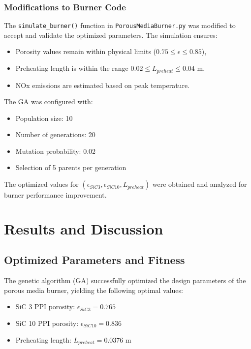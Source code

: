 \documentclass[12pt]{report}
\begin{document}
\subsection{Modifications to Burner Code}
The \texttt{simulate\_burner()} function in \texttt{PorousMediaBurner.py} was modified to accept and validate the optimized parameters. The simulation ensures:
\begin{itemize}
    \item Porosity values remain within physical limits ($0.75 \leq \epsilon \leq 0.85$),
    \item Preheating length is within the range $0.02 \leq L_{preheat} \leq 0.04$ m,
    \item NOx emissions are estimated based on peak temperature.
\end{itemize}

The GA was configured with:
\begin{itemize}
    \item Population size: 10
    \item Number of generations: 20
    \item Mutation probability: 0.02
    \item Selection of 5 parents per generation
\end{itemize}

The optimized values for $(\epsilon_{SiC3}, \epsilon_{SiC10}, L_{preheat})$ were obtained and analyzed for burner performance improvement.

\chapter{Results and Discussion}

\section{Optimized Parameters and Fitness}

The genetic algorithm (GA) successfully optimized the design parameters of the porous media burner, yielding the following optimal values:

\begin{itemize}
    \item SiC 3 PPI porosity: $\epsilon_{SiC3} = 0.765$
    \item SiC 10 PPI porosity: $\epsilon_{SiC10} = 0.836$
    \item Preheating length: $L_{preheat} = 0.0376$ m
\end{itemize}
\end{document}
